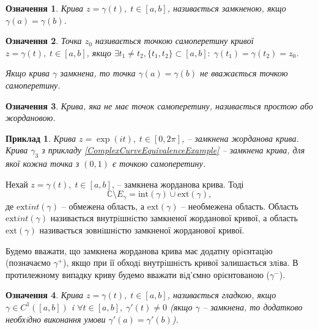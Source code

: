 \documentclass[10pt]{report} %
\let\oldforall\forall
\renewcommand{\forall}{\oldforall\;}
\let\oldexists\exists
\renewcommand{\exists}{\oldexists\;}
\newtheorem{definition}{Означення}[section]
\newtheorem{example}{\indent Приклад}[section]
\begin{document}
\begin{definition}
Крива $z = \gamma(t),\;t \in [a, b]$, називається замкненою, якщо $\gamma(a) = \gamma(b)$.
\end{definition}
\begin{definition}
Точка $z_0$ називається точкою самоперетину кривої $z = \gamma(t),\;t \in [a, b]$, якщо $\oldexists t_1\neq t_2 ,\{t_1 , t_2 \}\subset [a, b]
 :\;\gamma(t_1 ) = \gamma(t_2 ) = z_0$.

Якщо крива $\gamma$ замкнена, то точка $\gamma(a) = \gamma(b)$ не вважається точкою самоперетину.
\end{definition}
\begin{definition}Крива, яка не має точок самоперетину, називається простою або жордановою.\end{definition}
\begin{example}
Крива $z = \exp(it),\;t\in [0, 2\pi]$, -- замкнена жорданова крива. Крива $\gamma_3$ з прикладу \ref{ComplexCurveEquivalenceExample} -- замкнена
 крива, для якої кожна точка з $(0, 1)$ є точкою самоперетину.
\end{example}

Нехай $z=\gamma(t),\;t\in[a, b]$, -- замкнена жорданова крива. Тоді
\[\mathbb{C}\setminus E_{\gamma}=\text{int}(\gamma)\cup\text{ext}(\gamma),\]
де $\text{ext}{int}(\gamma)$ -- обмежена область, а $\text{ext}(\gamma)$ -- необмежена область. Область $\text{ext}{int}(\gamma)$ 
називається внутрiшнiстю замкненої жорданової  кривої, а область $\text{ext}(\gamma)$ називається зовнiшнiстю замкненої жорданової кривої.

Будемо вважати, що замкнена жорданова крива має додатну орiєнтацiю (позначаємо $\gamma^+$), якщо при її обходi внутрiшнiсть кривої залишається 
злiва.  В протилежному випадку криву будемо вважати вiд’ємно орiєнтованою ($\gamma^-$).
\begin{definition}
Крива $z = \gamma(t),\;t\in [a, b]$, називається гладкою, якщо $\gamma\in C^1 ([a, b])$ i
$\oldforall t\in [a, b],\;\gamma' (t) \neq 0$ (якщо $\gamma$ -- замкнена, то додатково необхiдно виконання умови
$\gamma' (a) = \gamma'(b)$).
\end{definition}
\end{document}
